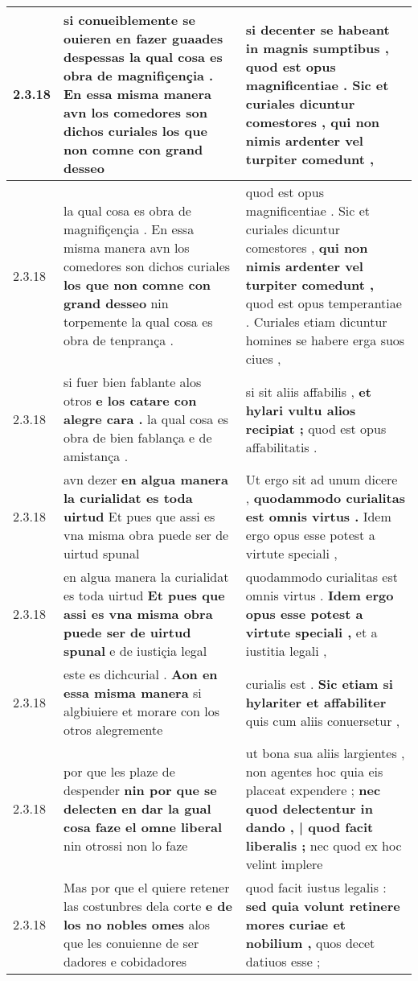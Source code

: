 \begin{tabular}{|p{1cm}|p{6.5cm}|p{6.5cm}|}
2.3.18 & si conueiblemente se ouieren en fazer guaades despessas \textbf{ la qual cosa es obra de magnifiçençia . En essa misma manera avn los comedores son dichos curiales } los que non comne con grand desseo & si decenter se habeant in magnis sumptibus , \textbf{ quod est opus magnificentiae . Sic et curiales dicuntur comestores , } qui non nimis ardenter vel turpiter comedunt , \\\hline
2.3.18 & la qual cosa es obra de magnifiçençia . En essa misma manera avn los comedores son dichos curiales \textbf{ los que non comne con grand desseo } nin torpemente la qual cosa es obra de tenprança . & quod est opus magnificentiae . Sic et curiales dicuntur comestores , \textbf{ qui non nimis ardenter vel turpiter comedunt , } quod est opus temperantiae . Curiales etiam dicuntur homines se habere erga suos ciues , \\\hline
2.3.18 & si fuer bien fablante alos otros \textbf{ e los catare con alegre cara . } la qual cosa es obra de bien fablança e de amistança . & si sit aliis affabilis , \textbf{ et hylari vultu alios recipiat ; } quod est opus affabilitatis . \\\hline
2.3.18 & avn dezer \textbf{ en algua manera la curialidat es toda uirtud } Et pues que assi es vna misma obra puede ser de uirtud spunal & Ut ergo sit ad unum dicere , \textbf{ quodammodo curialitas est omnis virtus . } Idem ergo opus esse potest a virtute speciali , \\\hline
2.3.18 & en algua manera la curialidat es toda uirtud \textbf{ Et pues que assi es vna misma obra puede ser de uirtud spunal } e de iustiçia legal & quodammodo curialitas est omnis virtus . \textbf{ Idem ergo opus esse potest a virtute speciali , } et a iustitia legali , \\\hline
2.3.18 & este es dichcurial . \textbf{ Aon en essa misma manera } si algbiuiere et morare con los otros alegremente & curialis est . \textbf{ Sic etiam si hylariter et affabiliter } quis cum aliis conuersetur , \\\hline
2.3.18 & por que les plaze de despender \textbf{ nin por que se delecten en dar la gual cosa faze el omne liberal } nin otrossi non lo faze & ut bona sua aliis largientes , non agentes hoc quia eis placeat expendere ; \textbf{ nec quod delectentur in dando , | quod facit liberalis ; } nec quod ex hoc velint implere \\\hline
2.3.18 & Mas por que el quiere retener las costunbres dela corte \textbf{ e de los no nobles omes } alos que les conuienne de ser dadores e cobidadores & quod facit iustus legalis : \textbf{ sed quia volunt retinere mores curiae et nobilium , } quos decet datiuos esse ; \\\hline

\end{tabular}
